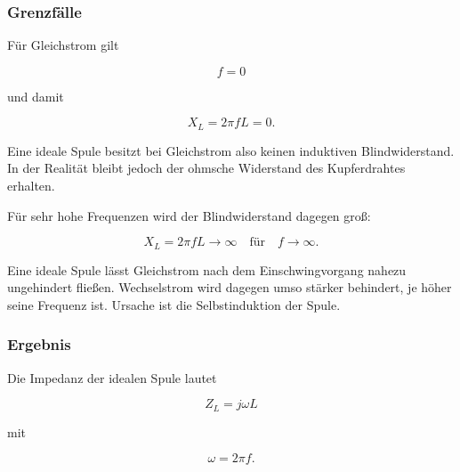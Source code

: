 \subsubsection{Grenzfälle}
\label{subsubsec:grenzfaelle-spule}

Für Gleichstrom gilt

\begin{equation}
	f = 0
	\label{eq:gleichstromfrequenz-spule}
\end{equation}

und damit

\begin{equation}
	X_L = 2\pi f L = 0.
	\label{eq:spule-gleichstrom-blindwiderstand}
\end{equation}

Eine ideale Spule besitzt bei Gleichstrom also keinen induktiven
Blindwiderstand. In der Realität bleibt jedoch der ohmsche Widerstand des
Kupferdrahtes erhalten.

Für sehr hohe Frequenzen wird der Blindwiderstand dagegen groß:

\begin{equation}
	X_L = 2\pi f L \rightarrow \infty
	\quad \text{für} \quad f \rightarrow \infty.
	\label{eq:spule-hohe-frequenzen}
\end{equation}

\begin{PhysicsBox}
	\label{box:physikalische-bedeutung-spulenimpedanz}
	Eine ideale Spule lässt Gleichstrom nach dem Einschwingvorgang nahezu
	ungehindert fließen. Wechselstrom wird dagegen umso stärker behindert, je
	höher seine Frequenz ist. Ursache ist die Selbstinduktion der Spule.
\end{PhysicsBox}

\subsubsection{Ergebnis}
\label{subsubsec:ergebnis-impedanz-spule}

Die Impedanz der idealen Spule lautet

\begin{equation}
	\boxed{
		Z_L = j\omega L
	}
	\label{eq:endformel-impedanz-spule}
\end{equation}

mit

\begin{equation}
	\omega = 2\pi f.
	\label{eq:endformel-kreisfrequenz-spule}
\end{equation}

